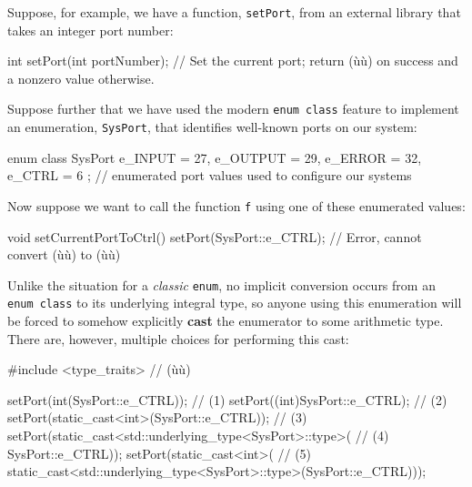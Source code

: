 Suppose, for example, we have a function, \texttt{setPort}, from an
external library that takes an integer port number:

\begin{emcppslisting}
int setPort(int portNumber);
    // Set the current port; return (ù{}ù) on success and a nonzero value otherwise.
\end{emcppslisting}

\noindent Suppose further that we have used the modern
\texttt{enum}~\texttt{class} feature to implement an enumeration,
\texttt{SysPort}, that identifies well-known ports on our system:

\begin{emcppslisting}
enum class SysPort { e_INPUT = 27, e_OUTPUT = 29, e_ERROR = 32, e_CTRL = 6 };
    // enumerated port values used to configure our systems
\end{emcppslisting}

\noindent Now suppose we want to call the function \texttt{f} using one of these
enumerated values:

\begin{emcppslisting}
void setCurrentPortToCtrl()
{
    setPort(SysPort::e_CTRL);  // Error, cannot convert (ù{}ù) to (ù{}ù)
}
\end{emcppslisting}

\noindent Unlike the situation for a \emph{classic} \texttt{enum}, no implicit
conversion occurs from an \texttt{enum}~\texttt{class} to its underlying
integral type, so anyone using this enumeration will be forced to
somehow explicitly \textbf{cast} the enumerator to some arithmetic type.
There are, however, multiple choices for performing this cast:

\begin{emcppslisting}
#include <type_traits>  // (ù{}ù)

setPort(int(SysPort::e_CTRL));                                           // (1)
setPort((int)SysPort::e_CTRL);                                           // (2)
setPort(static_cast<int>(SysPort::e_CTRL));                              // (3)
setPort(static_cast<std::underlying_type<SysPort>::type>(                // (4)
                                                         SysPort::e_CTRL));
setPort(static_cast<int>(                                                // (5)
         static_cast<std::underlying_type<SysPort>::type>(SysPort::e_CTRL)));
\end{emcppslisting}

